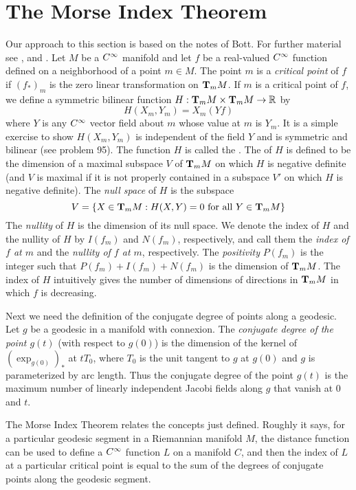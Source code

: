 \documentclass[../main]{subfiles}
\begin{document}
\section{The Morse Index Theorem}\label{ch10:s4}

Our approach to this section is based on the notes of Bott. For further material see \cite{milnor1969morse}, \cite{ambrose1961the} and \cite{morse1934calculus}. Let $M$ be a $\CInfty$ manifold and let $f$ be a real-valued $\CInfty$ function defined on a neighborhood of a point $m\in M$. The point $m$ is a \emph{critical point} of $f$ if $(f_*)_m$ is the zero linear transformation on $\ts Mm$. If $m$ is a critical point of $f$, we define a symmetric bilinear function $H:\ts Mm\times\ts Mm\functionMaps\bR$ by
\[H(X_m,Y_m) = X_m(Yf)\]
where $Y$ is any $\CInfty$ vector field about $m$ whose value at $m$ is $Y_m$. It is a simple exercise to show $H(X_m,Y_m)$ is independent of the field $Y$ and is symmetric and bilinear (see problem 95). The function $H$ is called the . The  of $H$ is defined to be the dimension of a maximal subspace $V$ of $\ts Mm$ on which $H$ is negative definite (and $V$ is maximal if it is not properly contained in a subspace $V'$ on which $H$ is negative definite). The \emph{null space} of $H$ is the subspace
\[V = \brc{X\in\ts Mm: H(X,Y)=0 \text{ for all } Y\in\ts Mm}\]
The \emph{nullity} of $H$ is the dimension of its null space. We denote the index of $H$ and the nullity of $H$ by $I(f_m)$ and $N(f_m)$, respectively, and call them the \emph{index of $f$ at $m$} and the \emph{nullity of $f$ at $m$}, respectively. The \emph{positivity} $P(f_m)$ is the integer such that $P(f_m)+I(f_m)+N(f_m)$ is the dimension of $\ts Mm$. The index of $H$ intuitively gives the number of dimensions of directions in $\ts Mm$ in which $f$ is decreasing.

Next we need the definition of the conjugate degree of points along a geodesic. Let $g$ be a geodesic in a manifold with connexion. The \emph{conjugate degree of the point $g(t)$} (with respect to $g(0)$) is the dimension of the kernel of $(\exp_{g(0)})_*$ at $tT_0$, where $T_0$ is the unit tangent to $g$ at $g(0)$ and $g$ is parameterized by arc length. Thus the conjugate degree of the point $g(t)$ is the maximum number of linearly independent Jacobi fields along $g$ that vanish at 0 and $t$.

The Morse Index Theorem relates the concepts just defined. Roughly it says, for a particular geodesic segment in a Riemannian manifold $M$, the distance function can be used to define a $\CInfty$ function $L$ on a manifold $C$, and then the index of $L$ at a particular critical point is equal to the sum of the degrees of conjugate points along the geodesic segment.
\end{document}
